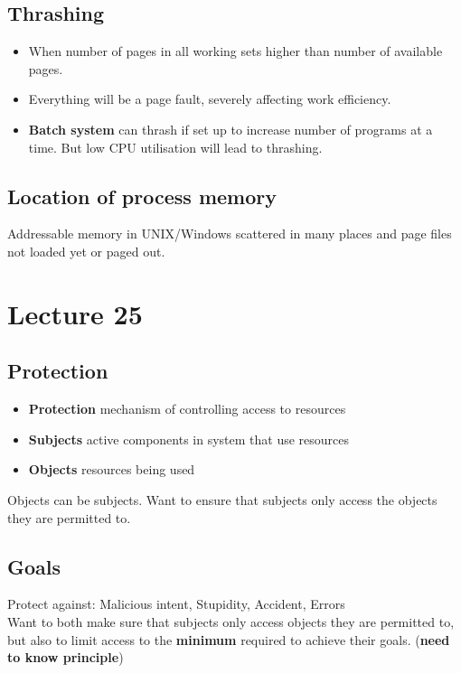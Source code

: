 \documentclass{article}
\begin{document}
	\subsection{Thrashing}
		\begin{itemize}
			\item When number of pages in all working sets higher than number of available pages.
			\item Everything will be a page fault, severely affecting work efficiency.
			\item \textbf{Batch system} can thrash if set up to increase number of programs at a time. But low CPU utilisation will lead to thrashing.
		\end{itemize}
		
	\subsection{Location of process memory}
		Addressable memory in UNIX/Windows scattered in many places and page files not loaded yet or paged out.
		
\section{Lecture 25}
	\subsection{Protection}
		\begin{itemize}
			\item \textbf{Protection} mechanism of controlling access to resources
			\item \textbf{Subjects} active components in system that use resources
			\item \textbf{Objects} resources being used
		\end{itemize}
		
		Objects can be subjects. Want to ensure that subjects only access the objects they are permitted to.
		
	\subsection{Goals}
		Protect against: Malicious intent, Stupidity, Accident, Errors\\
		
		Want to both make sure that subjects only access objects they are permitted to, but also to limit access to the \textbf{minimum} required to achieve their goals. (\textbf{need to know principle})\\
		
\end{document}
